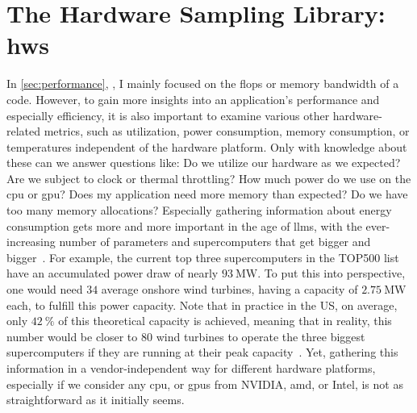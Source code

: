 \chapter{The Hardware Sampling Library: hws}
\label{chapter:hws}

In \autoref{sec:performance}, , I mainly focused on the \acrfull{flops} or memory bandwidth of a code. 
However, to gain more insights into an application's performance and especially efficiency, it is also important to examine various other hardware-related metrics, such as utilization, power consumption, memory consumption, or temperatures independent of the hardware platform. 
Only with knowledge about these can we answer questions like: Do we utilize our hardware as we expected? Are we subject to clock or thermal throttling? How much power do we use on the \gls{cpu} or \gls{gpu}? Does my application need more memory than expected? Do we have too many memory allocations? 
Especially gathering information about energy consumption gets more and more important in the age of \glspl{llm}, with the ever-increasing number of parameters and supercomputers that get bigger and bigger~\cite{de_vries_growing_2023, luccioni_estimating_2023}. 
For example, the current top three supercomputers in the TOP500 list~\cite{top500org_november_2024} have an accumulated power draw of nearly $\SI{93}{\mega\watt}$. 
To put this into perspective, one would need $\num{34}$ average onshore wind turbines, having a capacity of $\SI{2.75}{\mega\watt}$ each, to fulfill this power capacity. 
Note that in practice in the US, on average, only $\SI{42}{\percent}$ of this theoretical capacity is achieved, meaning that in reality, this number would be closer to $\num{80}$ wind turbines to operate the three biggest supercomputers if they are running at their peak capacity~\cite{usgs_how_2022}. 
Yet, gathering this information in a vendor-independent way for different hardware platforms, especially if we consider any \gls{cpu}, or \glspl{gpu} from NVIDIA, \gls{amd}, or Intel, is not as straightforward as it initially seems. 

